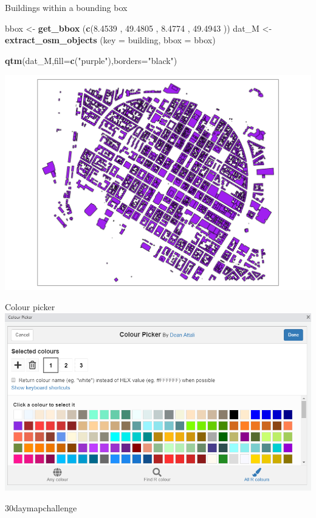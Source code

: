 \documentclass[
  ignorenonframetext,
]{beamer}
\newenvironment{Shaded}{\begin{snugshade}}{\end{snugshade}}
\newcommand{\DataTypeTok}[1]{\textcolor[rgb]{0.13,0.29,0.53}{#1}}
\newcommand{\FloatTok}[1]{\textcolor[rgb]{0.00,0.00,0.81}{#1}}
\newcommand{\KeywordTok}[1]{\textcolor[rgb]{0.13,0.29,0.53}{\textbf{#1}}}
\newcommand{\NormalTok}[1]{#1}
\newcommand{\StringTok}[1]{\textcolor[rgb]{0.31,0.60,0.02}{#1}}
\begin{document}
\begin{frame}[fragile]{Buildings within a bounding box}
\protect\hypertarget{buildings-within-a-bounding-box}{}
\begin{Shaded}
\begin{Highlighting}[]
\NormalTok{bbox \textless{}{-}}\StringTok{ }\KeywordTok{get\_bbox}\NormalTok{ (}\KeywordTok{c}\NormalTok{(}\FloatTok{8.4539}\NormalTok{ , }\FloatTok{49.4805}\NormalTok{  , }\FloatTok{8.4774}\NormalTok{ , }\FloatTok{49.4943}\NormalTok{ ))}
\NormalTok{dat\_M \textless{}{-}}\StringTok{ }\KeywordTok{extract\_osm\_objects}\NormalTok{ (}\DataTypeTok{key =} \StringTok{\textquotesingle{}building\textquotesingle{}}\NormalTok{, }\DataTypeTok{bbox =}\NormalTok{ bbox)}
\end{Highlighting}
\end{Shaded}

\begin{Shaded}
\begin{Highlighting}[]
\KeywordTok{qtm}\NormalTok{(dat\_M,}\DataTypeTok{fill=}\KeywordTok{c}\NormalTok{(}\StringTok{"purple"}\NormalTok{),}\DataTypeTok{borders=}\StringTok{"black"}\NormalTok{)}
\end{Highlighting}
\end{Shaded}

\includegraphics{quick_high_quality_maps_files/figure-beamer/unnamed-chunk-37-1.pdf}
\end{frame}

\begin{frame}{Colour picker}
\protect\hypertarget{colour-picker}{}
\includegraphics{pics/colourpicker.png}
\end{frame}

\begin{frame}{30daymapchallenge}
\protect\hypertarget{daymapchallenge}{}
\end{frame}
\end{document}
